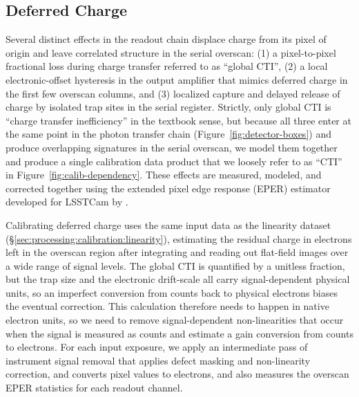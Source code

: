 

\subsection{Deferred Charge} \label{sec:processing:calibration:cti}

Several distinct effects in the readout chain displace charge from its pixel of origin and leave correlated structure in the serial overscan: (1) a pixel-to-pixel fractional loss during charge transfer referred to as ``global CTI'', (2) a local electronic-offset hysteresis in the output amplifier that mimics deferred charge in the first few overscan columns, and (3) localized capture and delayed release of charge by isolated trap sites in the serial register.
Strictly, only global CTI is ``charge transfer inefficiency'' in the textbook sense, but because all three enter at the same point in the photon transfer chain (Figure~\ref{fig:detector-boxes}) and produce overlapping signatures in the serial overscan, we model them together and produce a single calibration data product that we loosely refer to as ``CTI'' in Figure~\ref{fig:calib-dependency}.
These effects are measured, modeled, and corrected together using the extended pixel edge response (EPER) estimator developed for LSSTCam by \citet{2021JATIS...7d48002S}.

Calibrating deferred charge uses the same input data as the linearity dataset (\S\ref{sec:processing:calibration:linearity}), estimating the residual charge in electrons left in the overscan region after integrating and reading out flat-field images over a wide range of signal levels.
The global CTI is quantified by a unitless fraction, but the trap size and the electronic drift-scale all carry signal-dependent physical units, so an imperfect conversion from counts back to physical electrons biases the eventual correction.
This calculation therefore needs to happen in native electron units, so we need to remove signal-dependent non-linearities that occur when the signal is measured as counts and estimate a gain conversion from counts to electrons.
For each input exposure, we apply an intermediate pass of instrument signal removal that applies defect masking and non-linearity correction, and converts pixel values to electrons, and also measures the overscan EPER statistics for each readout channel.


